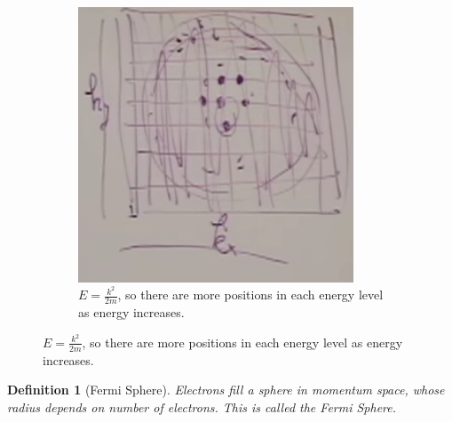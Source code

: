 \documentclass[]{article}
\newtheorem{defn}[thm]{Definition}
\begin{document}
\begin{figure}[H]
\begin{subfigure}{0.32\textwidth}
	\end{subfigure}
	\begin{subfigure}{0.32\textwidth}
		\caption{$E=\frac{k^2}{2m}$, so there are more positions in each energy level as energy increases.}
		\includegraphics[width=0.9\textwidth]{more-fermions}
	\end{subfigure}
\end{figure}

\begin{defn}[Fermi Sphere]
	Electrons fill a sphere in momentum space, whose radius depends on number of electrons. This is called the Fermi Sphere.
\end{defn}
\end{document}
